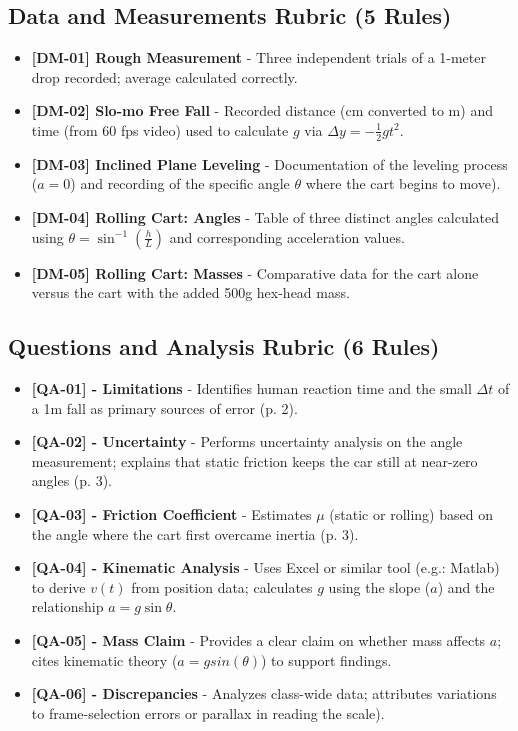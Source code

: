 \documentclass{article}
\begin{document}
\subsection*{Data and Measurements Rubric (5 Rules)}
\begin{itemize}
\item \textbf{ [DM-01] Rough Measurement } - Three independent trials of a 1-meter drop recorded; average calculated correctly.
\item \textbf{ [DM-02] Slo-mo Free Fall } - Recorded distance (cm converted to m) and time (from 60 fps video) used to calculate $g$ via $ \Delta y = -\frac{1}{2} g t^2 $.
\item \textbf{ [DM-03] Inclined Plane Leveling } - Documentation of the leveling process ($ a = 0 $) and recording of the specific angle $ \theta $ where the cart begins to move).
\item \textbf{ [DM-04] Rolling Cart: Angles } - Table of three distinct angles calculated using $ \theta = \sin^{-1} \left( \frac{h}{L} \right) $ and corresponding acceleration values.
\item \textbf{ [DM-05] Rolling Cart: Masses } - Comparative data for the cart alone versus the cart with the added 500g hex-head mass.
\end{itemize}

\subsection*{Questions and Analysis Rubric (6 Rules)}
\begin{itemize}
\item \textbf{ [QA-01] - Limitations } - Identifies human reaction time and the small $ \Delta t $ of a 1m fall as primary sources of error (p. 2).
\item \textbf{ [QA-02] - Uncertainty } - Performs uncertainty analysis on the angle measurement; explains that static friction keeps the car still at near-zero angles (p. 3).
\item \textbf{ [QA-03] - Friction Coefficient } - Estimates $ \mu $ (static or rolling) based on the angle where the cart first overcame inertia (p. 3).
\item \textbf{ [QA-04] - Kinematic Analysis } - Uses Excel or similar tool (e.g.: Matlab) to derive $ v(t) $ from position data; calculates $ g $ using the slope ($ a $) and the relationship $ a = g \sin \theta $.
\item \textbf{ [QA-05] - Mass Claim } - Provides a clear claim on whether mass affects $ a $; cites kinematic theory ($ a = gsin(\theta) $) to support findings.
\item \textbf{ [QA-06] - Discrepancies } - Analyzes class-wide data; attributes variations to frame-selection errors or parallax in reading the scale).
\end{itemize}
\end{document}

